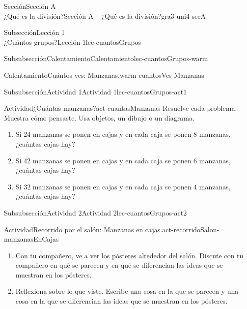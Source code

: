 \begin{sectionptx}{Sección}{{\Large Sección A\\}¿Qué es la división?}{}{Sección A -~¿Qué es la división?}{}{}{gra3-uni4-secA}
\begin{subsectionptx}{Subsección}{{\normalsize Lección 1\\[-0.05cm]}¿Cuántos grupos?}{}{Lección 1}{}{}{lec-cuantosGrupos}
\begin{subsubsectionptx}{Subsubsección}{Calentamiento}{}{Calentamiento}{}{}{lec-cuantosGrupos-warm}
\begin{exploration}{Calentamiento}{Cuántos ves: Manzanas.}{warm-cuantosVes-Manzanas}
\begin{sidebyside}{2}{0.0}{0.0}{0.05}
\begin{sbspanel}{0.55}
\begin{image}{0}{1}{0}{}
\end{image}%
\end{sbspanel}%
\end{sidebyside}%
\end{exploration}%
%
\end{subsubsectionptx}
%
%
\typeout{************************************************}
\typeout{************************************************}
%
\begin{subsubsectionptx}{Subsubsección}{Actividad 1}{}{Actividad 1}{}{}{lec-cuantosGrupos-act1}
\begin{activity}{Actividad}{¿Cuántas manzanas?}{act-cuantasManzanas}%
Resuelve cada problema. Muestra cómo pensaste. Usa objetos, un dibujo o un diagrama.%
\par
%
\begin{enumerate}
\item{}Si 24 manzanas se ponen en cajas y en cada caja se ponen 8 manzanas, ¿cuántas cajas hay?%
\item{}Si 42 manzanas se ponen en cajas y en cada caja se ponen 6 manzanas, ¿cuántas cajas hay?%
\item{}Si 32 manzanas se ponen en cajas y en cada caja se ponen 4 manzanas, ¿cuántas cajas hay?%
\end{enumerate}
%
\end{activity}%
\end{subsubsectionptx}
%
%
\typeout{************************************************}
\typeout{************************************************}
%
\begin{subsubsectionptx}{Subsubsección}{Actividad 2}{}{Actividad 2}{}{}{lec-cuantosGrupos-act2}
\begin{activity}{Actividad}{Recorrido por el salón: Manzanas en cajas.}{act-recorridoSalon-manzanasEnCajas}%
%
\begin{enumerate}
\item{}Con tu compañero, ve a ver los pósteres alrededor del salón. Discute con tu compañero en qué se parecen y en qué se diferencian las ideas que se muestran en los pósteres.%
\item{}Reflexiona sobre lo que viste. Escribe una cosa en la que se parecen y una cosa en la que se diferencian las ideas que se muestran en los pósteres.%
\end{enumerate}
%
\end{activity}%

\end{subsubsectionptx}
\end{subsectionptx}
\end{sectionptx}
